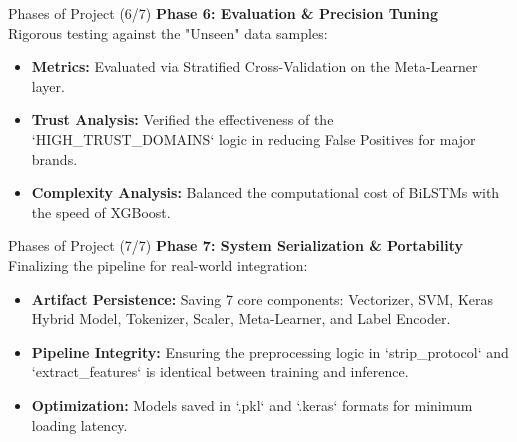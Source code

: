 \documentclass[aspectratio=169,xcolor=dvipsnames]{beamer}
\begin{document}
\begin{frame}{Phases of Project (6/7)}
\textbf{Phase 6: Evaluation & Precision Tuning} \\[0.2cm]
Rigorous testing against the "Unseen" data samples:
\begin{itemize}
    \item \textbf{Metrics:} Evaluated via Stratified Cross-Validation on the Meta-Learner layer.
    \item \textbf{Trust Analysis:} Verified the effectiveness of the `HIGH\_TRUST\_DOMAINS` logic in reducing False Positives for major brands.
    \item \textbf{Complexity Analysis:} Balanced the computational cost of BiLSTMs with the speed of XGBoost.
\end{itemize}

\end{frame}

\begin{frame}{Phases of Project (7/7)}
\textbf{Phase 7: System Serialization & Portability} \\[0.2cm]
Finalizing the pipeline for real-world integration:
\begin{itemize}
    \item \textbf{Artifact Persistence:} Saving 7 core components: Vectorizer, SVM, Keras Hybrid Model, Tokenizer, Scaler, Meta-Learner, and Label Encoder.
    \item \textbf{Pipeline Integrity:} Ensuring the preprocessing logic in `strip\_protocol` and `extract\_features` is identical between training and inference.
    \item \textbf{Optimization:} Models saved in `.pkl` and `.keras` formats for minimum loading latency.
\end{itemize}

\end{frame}

\end{document}
